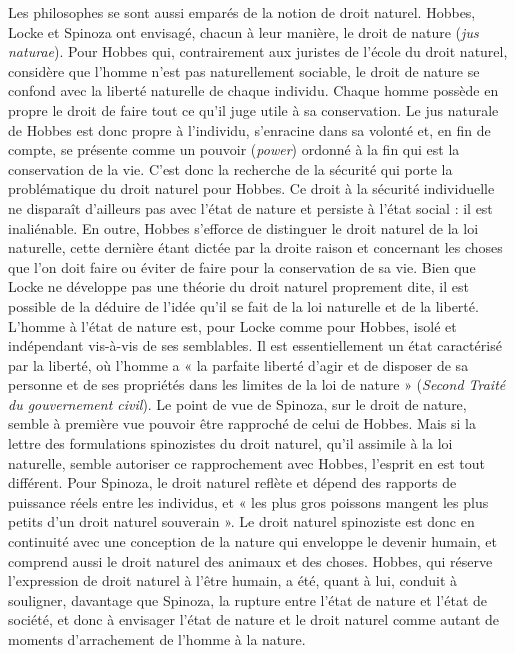 Les philosophes se sont aussi emparés
de la notion de droit naturel. Hobbes,
%
Locke et Spinoza ont envisagé, chacun à
leur manière, le droit de nature ({\it jus naturae}). Pour Hobbes qui, contrairement aux
juristes de l’école du droit naturel, considère que l’homme n’est pas naturellement
sociable, le droit de nature se confond
avec la liberté naturelle de chaque individu. Chaque homme possède en propre
le droit de faire tout ce qu'il juge utile à
sa conservation. Le jus naturale de
Hobbes est donc propre à l'individu, s’enracine dans sa volonté et, en fin de
compte, se présente comme un pouvoir
({\it power}) ordonné à la fin qui est la conservation de la vie. C’est donc la recherche
de la sécurité qui porte la problématique
du droit naturel pour Hobbes. Ce droit à
la sécurité individuelle ne disparaît d’ailleurs pas avec l’état de nature et persiste
à l’état social : il est inaliénable. En outre,
Hobbes s'efforce de distinguer le droit
naturel de la loi naturelle, cette dernière
étant dictée par la droite raison et concernant les choses que l’on doit faire ou éviter de faire pour la conservation de sa vie.
Bien que Locke ne développe pas une
théorie du droit naturel proprement dite,
il est possible de la déduire de l’idée qu’il
se fait de la loi naturelle et de la liberté.
L'homme à l'état de nature est, pour
Locke comme pour Hobbes, isolé et indépendant vis-à-vis de ses semblables. Il est
essentiellement un état caractérisé par la
liberté, où l’homme a « la parfaite liberté
d’agir et de disposer de sa personne et de
ses propriétés dans les limites de la loi de
nature » ({\it Second Traité du gouvernement
civil}). Le point de vue de Spinoza, sur le
droit de nature, semble à première vue
pouvoir être rapproché de celui de
Hobbes. Mais si la lettre des formulations
spinozistes du droit naturel, qu’il assimile
à la loi naturelle, semble autoriser ce rapprochement avec Hobbes, l’esprit en est
tout différent. Pour Spinoza, le droit naturel reflète et dépend des rapports de
puissance réels entre les individus, et
« les plus gros poissons mangent les plus
petits d’un droit naturel souverain ». Le
droit naturel spinoziste est donc en continuité avec une conception de la nature
qui enveloppe le devenir humain, et
comprend aussi le droit naturel des animaux et des choses. Hobbes, qui réserve
l’expression de droit naturel à l'être
humain, a été, quant à lui, conduit à souligner, davantage que Spinoza, la rupture
entre l’état de nature et l’état de société,
%
et donc à envisager l’état de nature et le
droit naturel comme autant de moments
d’arrachement de l’homme à la nature.
